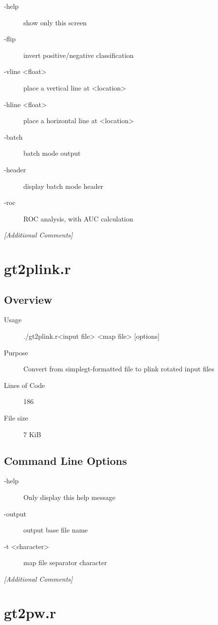 \begin{description}
\item[-help] show only this screen
\item[-flip] invert positive/negative classification
\item[-vline <float>] place a vertical line at <location>
\item[-hline <float>] place a horizontal line at <location>
\item[-batch] batch mode output
\item[-header] display batch mode header
\item[-roc] ROC analysis, with AUC calculation
\end{description}

\emph{[Additional Comments]}

\section{gt2plink.r}
\label{sec:gt2plink.r}

\subsection{Overview}
\label{sec:gt2plink.r-overview}

\begin{description}
\item[Usage] ./gt2plink.r<input file> <map file> [options]
\item[Purpose] Convert from simplegt-formatted file to plink rotated input files
\item[Lines of Code] 186
\item[File size] 7 KiB
\end{description}

\subsection{Command Line Options}
\label{sec:gt2plink.r-command-line}

\begin{description}
\item[-help] Only display this help message
\item[-output] output base file name
\item[-t <character>] map file separator character
\end{description}

\emph{[Additional Comments]}

\section{gt2pw.r}
\label{sec:gt2pw.r}

